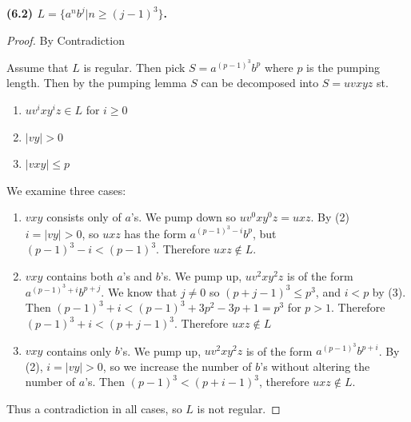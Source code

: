 \documentclass[11pt]{article}
\begin{document}
\textbf{(6.2) $L=\{a^nb^j|n\geq (j-1)^3\}$.}
\newline

\begin{proof} By Contradiction

Assume that $L$ is regular. Then pick $S = a^{(p-1)^3} b^p$ where $p$ is the pumping length. Then by the pumping lemma $S$ can be decomposed into $S = uvxyz$ st.

\begin{enumerate}[(1)]

 \item $uv^ixy^iz \in L$ for $i \geq 0$
 \item $|vy| > 0$
 \item $|vxy| \leq p$
\end{enumerate}

We examine three cases:

\begin{enumerate}
  \item $vxy$ consists only of $a$'s. We pump down so $uv^0 x y^0 z = uxz$. By (2) $i = |vy| > 0$, so $uxz$ has the form $a^{(p-1)^3 - i} b^p$, but $(p-1)^3 - i < (p-1)^3$. Therefore $uxz \notin L$.
  \item $vxy$ contains both $a$'s and $b$'s. We pump up, $uv^2xy^2z$ is of the form $a^{(p-1)^3 + i} b^{p + j}$. We know that $j \neq 0$ so $(p + j - 1)^3 \leq p^3$, and $i < p$ by (3). Then $(p-1)^3 + i < (p-1)^3 + 3p^2 - 3p + 1 = p^3$ for $p > 1$. Therefore $(p-1)^3 + i < (p + j - 1)^3$. Therefore $uxz \notin L$
  \item $vxy$ contains only $b$'s. We pump up, $uv^2xy^2z$ is of the form $a^{(p-1)^3}b^{p + i}$. By (2), $i = |vy| > 0$, so we increase the number of $b$'s without altering the number of $a$'s. Then $(p-1)^3 < (p + i - 1)^3$, therefore $uxz \notin L$.
\end{enumerate}

Thus a contradiction in all cases, so $L$ is not regular.

\end{proof}
\end{document}
